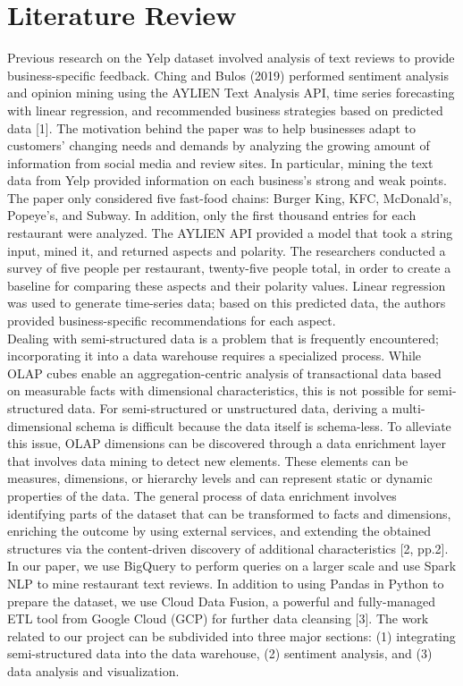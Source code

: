 \documentclass[11pt,journal,compsoc]{IEEEtran}
\begin{document}
\section{Literature Review}
Previous research on the Yelp dataset involved analysis of text reviews to provide business-specific feedback. Ching and Bulos (2019) performed sentiment analysis and opinion mining using the AYLIEN Text Analysis API, time series forecasting with linear regression, and recommended business strategies based on predicted data [1]. The motivation behind the paper was to help businesses adapt to customers' changing needs and demands by analyzing the growing amount of information from social media and review sites. In particular, mining the text data from Yelp provided information on each business’s strong and weak points. \\
\indent The paper only considered five fast-food chains: Burger King, KFC, McDonald’s, Popeye's, and Subway. In addition, only the first thousand entries for each restaurant were analyzed.
The AYLIEN API provided a model that took a string input, mined it, and returned aspects and polarity. The researchers conducted a survey of five people per restaurant, twenty-five people total, in order to create a baseline for comparing these aspects and their polarity values. Linear regression was used to generate time-series data; based on this predicted data, the authors provided business-specific recommendations for each aspect. \\
\indent Dealing with semi-structured data is a problem that is frequently encountered; incorporating it into a data warehouse requires a specialized process. While OLAP cubes enable an aggregation-centric analysis of transactional data based on measurable facts with dimensional characteristics, this is not possible for semi-structured data. For semi-structured or unstructured data, deriving a multi-dimensional schema is difficult because the data itself is schema-less. To alleviate this issue, OLAP dimensions can be discovered through a data enrichment layer that involves data mining to detect new elements. These elements can be measures, dimensions, or hierarchy levels and can represent static or dynamic properties of the data. The general process of data enrichment involves identifying parts of the dataset that can be transformed to facts and dimensions, enriching the outcome by using external services, and extending the obtained structures via the content-driven discovery of additional characteristics [2, pp.2]. \\
\indent In our paper, we use BigQuery to perform queries on a larger scale and use Spark NLP to mine restaurant text reviews. In addition to using Pandas in Python to prepare the dataset, we use Cloud Data Fusion, a powerful and fully-managed ETL tool from Google Cloud (GCP) for further data cleansing [3]. The work related to our project can be subdivided into three major sections: (1) integrating semi-structured data into the data warehouse, (2) sentiment analysis, and (3) data analysis and visualization.
\end{document}
